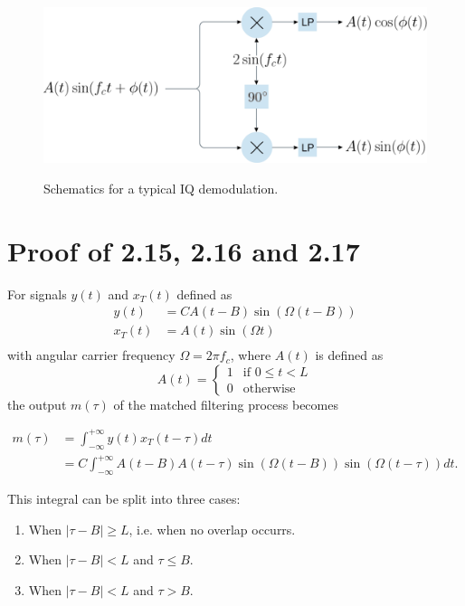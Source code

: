 \begin{appendices}
\begin{figure}
	\centering
	\hbox{\hspace{-0.5em} \includegraphics[scale=0.60]{figs_temp/iq_demod.jpg}}
	\caption{Schematics for a typical IQ demodulation.}
	\label{fig:iq_demod}
\end{figure}

\chapter{Proof of 2.15, 2.16 and 2.17}\label{apx:conv}

For signals $y(t)$ and $x_T(t)$ defined as
\begin{equation}
	\begin{split}
		y(t) &= CA(t - B)\sin(\Omega(t - B)) \\
		x_T(t) &= A(t)\sin(\Omega t) \\
	\end{split}
\end{equation}
with angular carrier frequency $\Omega = 2\pi f_c$, where $A(t)$ is defined as 
\begin{equation}
	A(t) = \begin{cases}
		1 & \text{if $0 \leq t < L$} \\
		0 & \text{otherwise}
	\end{cases}
\end{equation}
the output $m(\tau)$ of the matched filtering process becomes

\begin{align}
	m(\tau) 
	&= \int_{-\infty}^{+\infty}y(t)x_T(t-\tau)dt \\
	&= C \int_{-\infty}^{+\infty}A(t-B)A(t-\tau)\sin(\Omega(t-B))\sin(\Omega(t-\tau))dt.
\end{align}

This integral can be split into three cases:
\begin{enumerate}[label=(\roman*)]
	\item When $|\tau-B| \geq L$, i.e. when no overlap occurrs. 
	\item When $|\tau-B| < L$ and $\tau \leq B$.
	\item When $|\tau-B| < L$ and $\tau > B$.
\end{enumerate}


\end{appendices}

